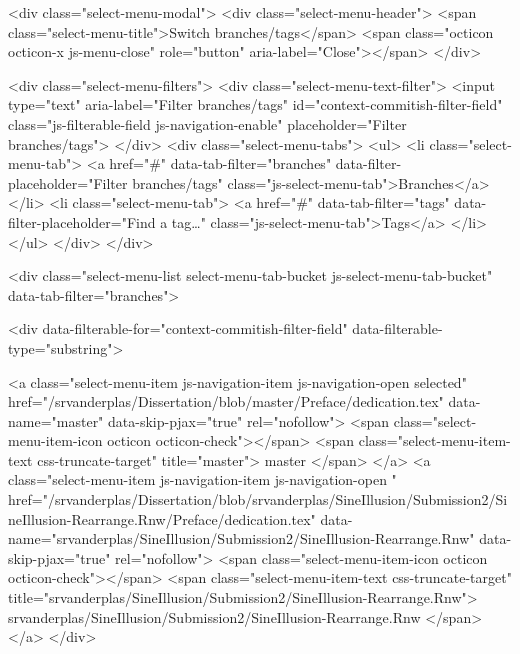     <div class="select-menu-modal">
      <div class="select-menu-header">
        <span class="select-menu-title">Switch branches/tags</span>
        <span class="octicon octicon-x js-menu-close" role="button" aria-label="Close"></span>
      </div>

      <div class="select-menu-filters">
        <div class="select-menu-text-filter">
          <input type="text" aria-label="Filter branches/tags" id="context-commitish-filter-field" class="js-filterable-field js-navigation-enable" placeholder="Filter branches/tags">
        </div>
        <div class="select-menu-tabs">
          <ul>
            <li class="select-menu-tab">
              <a href="#" data-tab-filter="branches" data-filter-placeholder="Filter branches/tags" class="js-select-menu-tab">Branches</a>
            </li>
            <li class="select-menu-tab">
              <a href="#" data-tab-filter="tags" data-filter-placeholder="Find a tag…" class="js-select-menu-tab">Tags</a>
            </li>
          </ul>
        </div>
      </div>

      <div class="select-menu-list select-menu-tab-bucket js-select-menu-tab-bucket" data-tab-filter="branches">

        <div data-filterable-for="context-commitish-filter-field" data-filterable-type="substring">


            <a class="select-menu-item js-navigation-item js-navigation-open selected"
               href="/srvanderplas/Dissertation/blob/master/Preface/dedication.tex"
               data-name="master"
               data-skip-pjax="true"
               rel="nofollow">
              <span class="select-menu-item-icon octicon octicon-check"></span>
              <span class="select-menu-item-text css-truncate-target" title="master">
                master
              </span>
            </a>
            <a class="select-menu-item js-navigation-item js-navigation-open "
               href="/srvanderplas/Dissertation/blob/srvanderplas/SineIllusion/Submission2/SineIllusion-Rearrange.Rnw/Preface/dedication.tex"
               data-name="srvanderplas/SineIllusion/Submission2/SineIllusion-Rearrange.Rnw"
               data-skip-pjax="true"
               rel="nofollow">
              <span class="select-menu-item-icon octicon octicon-check"></span>
              <span class="select-menu-item-text css-truncate-target" title="srvanderplas/SineIllusion/Submission2/SineIllusion-Rearrange.Rnw">
                srvanderplas/SineIllusion/Submission2/SineIllusion-Rearrange.Rnw
              </span>
            </a>
        </div>

